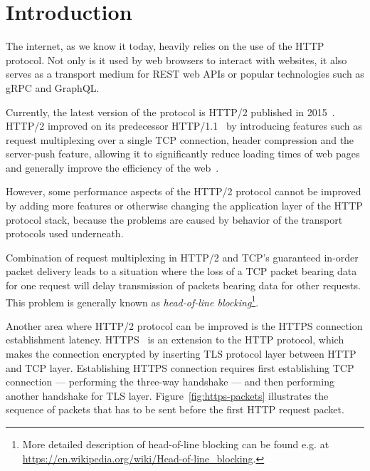 \chapter{Introduction}

The internet, as we know it today, heavily relies on the use of the HTTP protocol. Not only is it
used by web browsers to interact with websites, it also serves as a transport medium for REST web
APIs or popular technologies such as gRPC and GraphQL\@.

Currently, the latest version of the protocol is HTTP/2 published in 2015~\cite{rfc7540}. HTTP/2
improved on its predecessor HTTP/1.1~\cite{rfc7230} by introducing features such as request
multiplexing over a single TCP connection, header compression and the server-push feature, allowing
it to significantly reduce loading times of web pages and generally improve the efficiency of the
web~\cite{deSaxce2015}.

However, some performance aspects of the HTTP/2 protocol cannot be improved by adding more features
or otherwise changing the application layer of the HTTP protocol stack, because the problems are
caused by behavior of the transport protocols used underneath.

Combination of request multiplexing in HTTP/2 and TCP's guaranteed in-order packet delivery leads to
a situation where the loss of a TCP packet bearing data for one request will delay transmission of
packets bearing data for other requests. This problem is generally known as \textit{head-of-line
blocking}\footnote{More detailed description of head-of-line blocking can be found e.g\@. at \url{https://en.wikipedia.org/wiki/Head-of-line_blocking}.}.

Another area where HTTP/2 protocol can be improved is the HTTPS connection establishment latency.
HTTPS~\cite{rfc2818} is an extension to the HTTP protocol, which makes the connection encrypted by
inserting TLS protocol layer between HTTP and TCP layer. Establishing HTTPS connection requires
first establishing TCP connection --- performing the three-way handshake --- and then performing
another handshake for TLS layer. Figure~\ref{fig:https-packets} illustrates the sequence of packets that has to be sent before the first HTTP request packet.

